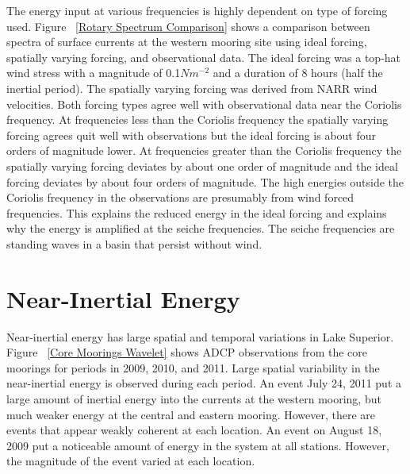 The energy input at various frequencies is highly dependent on type of forcing used.  Figure ~\ref{Rotary Spectrum Comparison} shows a
comparison between spectra of surface currents at the western mooring site using ideal forcing, spatially varying forcing, and observational data. 
The ideal forcing was a top-hat wind stress with a magnitude of 0.1$Nm^{-2}$ and a duration of 8 hours (half the inertial period). The spatially varying forcing
was derived from NARR wind velocities. Both forcing types agree well with observational data near the Coriolis frequency. At frequencies less than the
Coriolis frequency the spatially varying forcing agrees quit well with observations but the ideal forcing is about four orders of magnitude lower. At frequencies
greater than the Coriolis frequency the spatially varying forcing deviates by about one order of magnitude and the ideal forcing deviates by about four orders 
of magnitude. The high energies outside the Coriolis frequency in the observations are presumably from wind forced frequencies. This explains the reduced
energy in the ideal forcing and explains why the energy is amplified at the seiche frequencies. The seiche frequencies are standing waves in a basin that persist
without wind. 


\section{Near-Inertial Energy}

Near-inertial energy has large spatial and temporal variations in Lake Superior. Figure ~\ref{Core Moorings Wavelet} shows ADCP observations from the core moorings
for periods in 2009, 2010, and 2011. Large spatial variability in the near-inertial energy is observed during each period. An event July 24, 2011 put a large amount of 
inertial energy into the currents at the western mooring, but much weaker energy at the central and eastern mooring. However, there are events that appear weakly coherent
at each location. An event on August 18, 2009 put a noticeable amount of energy in the system at all stations. However, the magnitude of the event varied at each location. 


